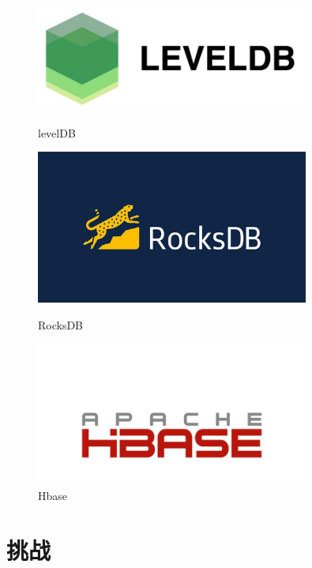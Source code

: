 \documentclass[fontset=windows]{article}
\begin{document}
\begin{figure}[H]
\centering
\begin{minipage}[ht]{0.4\linewidth}   
    \centering   
    \includegraphics[width=0.8\textwidth]{img/levelDB.jpg}
    \caption{levelDB}
    \label{fig:levelDB}
\end{minipage}
\begin{minipage}[ht]{0.4\linewidth} %
    \centering
    \includegraphics[width=0.8\textwidth]{img/RocksDB.jpg}
    \caption{RocksDB}
    \label{fig:rocksdb}
\end{minipage} 
\begin{minipage}[ht]{0.4\linewidth} %
    \centering
    \includegraphics[width=0.8\textwidth]{img/HBase.jpeg}
    \caption{Hbase}
    \label{fig:hbase}
\end{minipage}
\end{figure}

\section{挑战}
\end{document}
